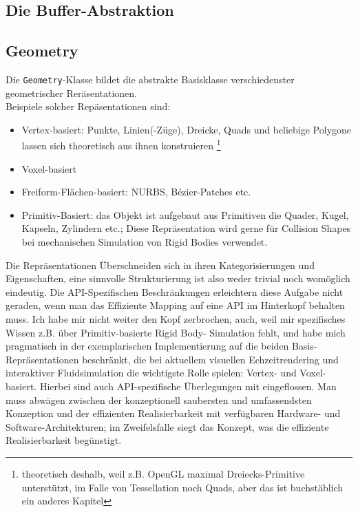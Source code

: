 	

    	
\subsection{Die Buffer-Abstraktion}  
	
		



\subsection{Geometry}
	\label{sec:geometry}
	Die \lstinline|Geometry|-Klasse bildet die abstrakte Basisklasse verschiedenster geometrischer Reräsentationen.\\
	Beispiele solcher Repäsentationen sind:
	\begin{itemize}
		\item Vertex-basiert:  Punkte, Linien(-Züge), Dreicke, Quads und beliebige Polygone lassen sich theoretisch
		aus ihnen konstruieren \footnote{theoretisch deshalb, weil z.B. OpenGL maximal Dreiecks-Primitive unterstützt, im 
		Falle von Tessellation noch Quads, aber das ist buchstäblich ein anderes Kapitel}
		\item Voxel-basiert
		\item Freiform-Flächen-basiert: NURBS, Bézier-Patches etc.
		\item Primitiv-Basiert: das Objekt ist aufgebaut aus Primitiven die Quader, Kugel, Kapseln, Zylindern etc.;
			Diese Repräsentation wird gerne für Collision Shapes bei mechanischen Simulation von Rigid Bodies verwendet.
	\end{itemize}
	Die Repräsentationen Überschneiden sich in ihren Kategorisierungen und Eigenschaften, eine sinnvolle Strukturierung ist 
	also weder trivial noch womöglich eindeutig. Die API-Spezifischen Beschränkungen erleichtern diese Aufgabe nicht 
	geraden, wenn man das Effiziente Mapping auf eine API im Hinterkopf behalten muss.
	Ich habe mir nicht weiter den Kopf zerbrochen, auch, weil mir spezifisches Wissen z.B. über Primitiv-basierte
	Rigid Body- Simulation fehlt, und habe mich pragmatisch in der exemplarischen Implementierung auf die
	beiden Basis-Repräsentationen beschränkt, die bei aktuellem visuellen Echzeitrendering und interaktiver
	Fluidsimulation die wichtigste Rolle spielen: Vertex- und Voxel-basiert. Hierbei sind auch API-spezifische Überlegungen
	mit eingeflossen. Man muss abwägen zwischen der konzeptionell saubersten und umfassendsten Konzeption
	und der effizienten Realisierbarkeit mit verfügbaren Hardware- und Software-Architekturen;
	im Zweifelsfalle siegt das Konzept, was die effiziente Realisierbarkeit begünstigt.\\
	
